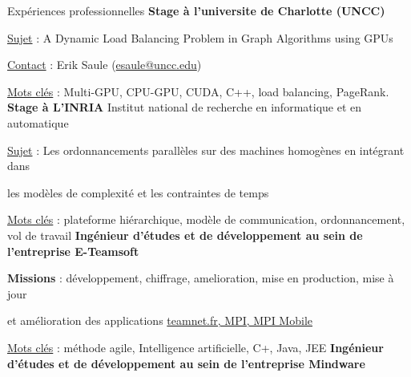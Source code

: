 \begin{rubric}{Expériences professionnelles}
%
\entry*[]
 \textbf{Stage à l’universite de Charlotte (UNCC)}
     \hfill{} 
	\par \underline{Sujet} : A Dynamic Load Balancing Problem in Graph Algorithms using GPUs
	\hfill {}
    \par \underline{Contact} : Erik Saule (\href{mailto:esaule@uncc.edu}{esaule@uncc.edu})
    \hfill {}
	\par \underline{Mots clés} : Multi-GPU, CPU-GPU, CUDA, C++, load balancing, PageRank.
%
\entry*[]
    \textbf{Stage à L'INRIA} Institut national de recherche en informatique et en automatique
     \hfill{} 
	\par \underline{Sujet} : Les ordonnancements parallèles sur des machines homogènes en intégrant dans
	\hfill {}
    \par les modèles de complexité et les contraintes de temps
    \hfill {}
	\par \underline{Mots clés} : plateforme hiérarchique, modèle de communication, ordonnancement, vol de travail
%
%
\entry*[]
	\textbf{Ingénieur d'études et de développement au sein de l’entreprise E-Teamsoft}
     \hfill{} 
	\par \textbf{Missions} : développement, chiffrage, amelioration, mise en production,
                              mise à jour 
    \hfill {}
    \par et amélioration des applications \url{teamnet.fr, MPI, MPI Mobile} 
    \hfill {}
    \par \underline{Mots clés} : méthode agile, Intelligence artificielle, C+, Java, JEE
\entry*[]
	\textbf{Ingénieur d'études et de développement au sein de l’entreprise Mindware}

\end{rubric}
